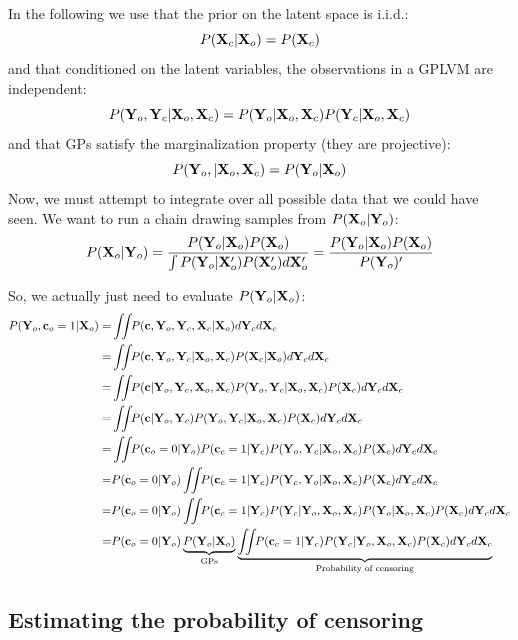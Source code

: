 \documentclass{article}
\begin{document}
\newcommand{\intlatent}{\int \!\!\!  \int \!\! }

In the following we use that the prior on the latent space is i.i.d.: $$P( \mathbf{X}_c | \mathbf{X}_o ) = P( \mathbf{X}_c )$$ 
and that conditioned on the latent variables, the observations in a GPLVM are independent:
$$ P( \mathbf{Y}_o, \mathbf{Y}_c | \mathbf{X}_o, \mathbf{X}_c ) = P( \mathbf{Y}_o | \mathbf{X}_o, \mathbf{X}_c ) P( \mathbf{Y}_c | \mathbf{X}_o, \mathbf{X}_c )$$ 
and that GPs satisfy the marginalization property (they are projective):
$$ P( \mathbf{Y}_o, | \mathbf{X}_o, \mathbf{X}_c ) = P( \mathbf{Y}_o | \mathbf{X}_o ) $$
%
Now, we must attempt to integrate over all possible data that we could have seen.  We want to run a chain drawing samples from $P(\mathbf{X}_o | \mathbf{Y}_o )$:
%
\begin{align}
P(\mathbf{X}_o | \mathbf{Y}_o ) = \frac{P(\mathbf{Y}_o | \mathbf{X}_o ) P(\mathbf{X}_o )}{\int P(\mathbf{Y}_o | \mathbf{X}_o' ) P(\mathbf{X}_o' ) d\mathbf{X}_o'}
= \frac{P(\mathbf{Y}_o | \mathbf{X}_o ) P(\mathbf{X}_o )}{P(\mathbf{Y}_o )'}
\end{align}

So, we actually just need to evaluate $P(\mathbf{Y}_o | \mathbf{X}_o )$:
%
\begin{align}
P(\vY_o, \vc_o = 1 | \vX_o) = & \intlatent P( \vc, \vY_o, \vY_c, \vX_c | \vX_o ) d\vY_c d\vX_c \\
= & \intlatent P( \vc, \vY_o, \vY_c | \vX_o, \vX_c ) P( \vX_c | \vX_o ) d\vY_c d\vX_c \\
= & \intlatent P( \vc | \vY_o, \vY_c, \vX_o, \vX_c ) P( \vY_o, \vY_c | \vX_o, \vX_c ) P( \vX_c ) d\vY_c d\vX_c\\
= & \intlatent P( \vc | \vY_o, \vY_c) P( \vY_o, \vY_c | \vX_o, \vX_c ) P( \vX_c ) d\vY_c d\vX_c \\
= & \intlatent P( \vc_o = 0 | \vY_o ) P( \vc_c = 1 | \vY_c ) P( \vY_o, \vY_c | \vX_o, \vX_c )  P( \vX_c ) d\vY_c d\vX_c\\
= & P( \vc_o = 0 | \vY_o ) \intlatent P( \vc_c = 1 | \vY_c ) P( \vY_c, \vY_o | \vX_o, \vX_c ) P( \vX_c ) d\vY_c d\vX_c \\
= & P( \vc_o = 0 | \vY_o ) \intlatent P( \vc_c = 1 | \vY_c ) P( \vY_c | \vY_o, \vX_o, \vX_c ) P( \vY_o | \vX_o, \vX_c ) P( \vX_c ) d\vY_c d\vX_c \\
= & P( \vc_o = 0 | \vY_o ) \underbrace{P( \vY_o | \vX_o )}_{\textrm{GPs}} \underbrace{\intlatent P( \vc_c = 1 | \vY_c ) P( \vY_c | \vY_o, \vX_o, \vX_c) P(\vX_c) d\vY_c d\vX_c }_{\textrm{Probability of censoring}}
\label{eqn:full_censoring_likelihood}
\end{align}

\subsection{Estimating the probability of censoring}
\end{document}
